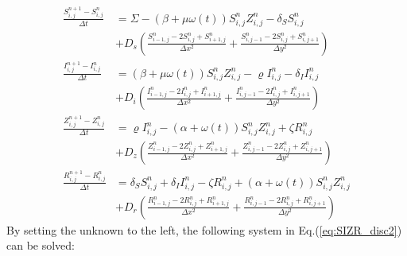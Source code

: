 \documentclass[%
twoside,                 %
final,                   %
chapterprefix=true,      %
open=right               %
10pt]{book}
\begin{document}
\begin{equation} \label{eq:SIZR_disc}
	\begin{aligned}
    \frac{S^{n+1}_{i,j}-S^n_{i,j}}{\Delta t} &= \Sigma - (\beta+\mu \omega(t))S^{n}_{i,j}Z^{n}_{i,j}- \delta_S S^{n}_{i,j} \\
        &+D_s\left(\frac{S^{n}_{i-1,j}-2S^{n}_{i,j}+S^{n}_{i+1,j}}{\Delta x^2}+\frac{S^{n}_{i,j-1}-2S^{n}_{i,j}+S^{n}_{i,j+1}}{\Delta y^2}\right) \\
    \frac{I^{n+1}_{i,j}-I^n_{i,j}}{\Delta t} &= (\beta+\mu \omega(t))S^{n}_{i,j}Z^{n}_{i,j}-\varrho I^{n}_{i,j}- \delta_I I^{n}_{i,j} \\
        &+D_i\left(\frac{I^{n}_{i-1,j}-2I^{n}_{i,j}+I^{n}_{i+1,j}}{\Delta x^2}+\frac{I^{n}_{i,j-1}-2I^{n}_{i,j}+I^{n}_{i,j+1}}{\Delta y^2}\right) \\
    \frac{Z^{n+1}_{i,j}-Z^n_{i,j}}{\Delta t} &= \varrho I^{n}_{i,j}-(\alpha+\omega(t))S^{n}_{i,j}Z^{n}_{i,j}+ \zeta R^{n}_{i,j} \\
        &+D_z\left(\frac{Z^{n}_{i-1,j}-2Z^{n}_{i,j}+Z^{n}_{i+1,j}}{\Delta x^2}+\frac{Z^{n}_{i,j-1}-2Z^{n}_{i,j}+Z^{n}_{i,j+1}}{\Delta y^2}\right) \\
    \frac{R^{n+1}_{i,j}-R^n_{i,j}}{\Delta t} &= \delta_S S^{n}_{i,j}+\delta_I I^{n}_{i,j}-\zeta R^{n}_{i,j}+(\alpha+\omega(t))S^{n}_{i,j}Z^{n}_{i,j} \\
        &+D_r\left(\frac{R^{n}_{i-1,j}-2R^{n}_{i,j}+R^{n}_{i+1,j}}{\Delta x^2}+\frac{R^{n}_{i,j-1}-2R^{n}_{i,j}+R^{n}_{i,j+1}}{\Delta y^2}\right) 
	\end{aligned}
\end{equation}
By setting the unknown to the left, the following system in Eq.(\ref{eq:SIZR_disc2}) can be solved: 
\end{document}
